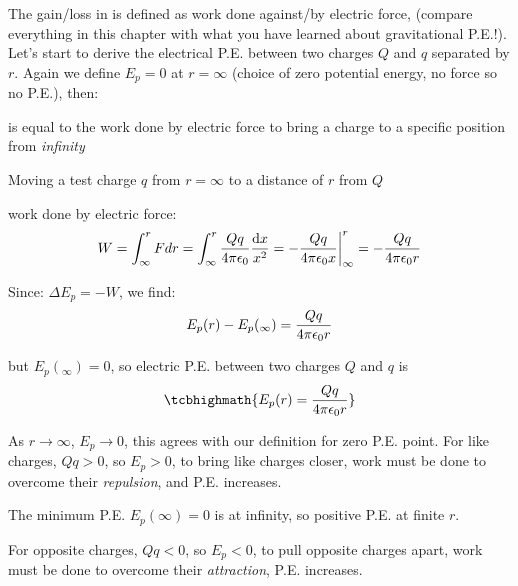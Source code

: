 The gain/loss in  is defined as work done against/by electric force, (compare everything in this chapter with what you have learned about gravitational P.E.!). Let's start to derive the electrical P.E. between two charges $Q$ and $q$ separated by $r$. Again we define $E_p=0$ at $r=\infty$ (choice of zero potential energy, no force so no P.E.), then:

\begin{ilight}
	 is equal to the work done by electric force to bring a charge to a specific position from \emph{infinity}
\end{ilight} 

Moving a test charge $q$ from $r=\infty$ to a distance of $r$ from $Q$

\begin{center}
\end{center}

work done by electric force: $$W=\int^r_\infty F dr = \int^r_\infty \frac{Qq}{4\pi\epsilon_0} \frac{\dd x}{x^2} = - \frac{Qq}{4\pi\epsilon_0 x}\bigg|^r_\infty = - \frac{Qq}{4\pi\epsilon_0 r} $$


Since: $\Delta E_p=-W$, we find: $$E_p(r) - E_p(_\infty) = \frac{Qq}{4\pi\epsilon_0 r}$$

but $E_p(_\infty) = 0$,  so electric P.E. between two charges $Q$ and $q$ is $$\tcbhighmath{E_p(r) = \frac{Qq}{\ec r}}$$

As $r \to \infty$, $E_p \to 0$, this agrees with our definition for zero P.E. point. For like charges, $Qq > 0$, so $E_p > 0$, to bring like charges closer, work must be done to overcome their \emph{repulsion}, and P.E. increases.

The minimum P.E. $E_p(\infty)=0$ is at infinity, so positive P.E. at finite $r$. 

For opposite charges, $Qq < 0$, so $E_p < 0$, to pull opposite charges apart, work must be done to overcome their \emph{attraction}, P.E. increases.

